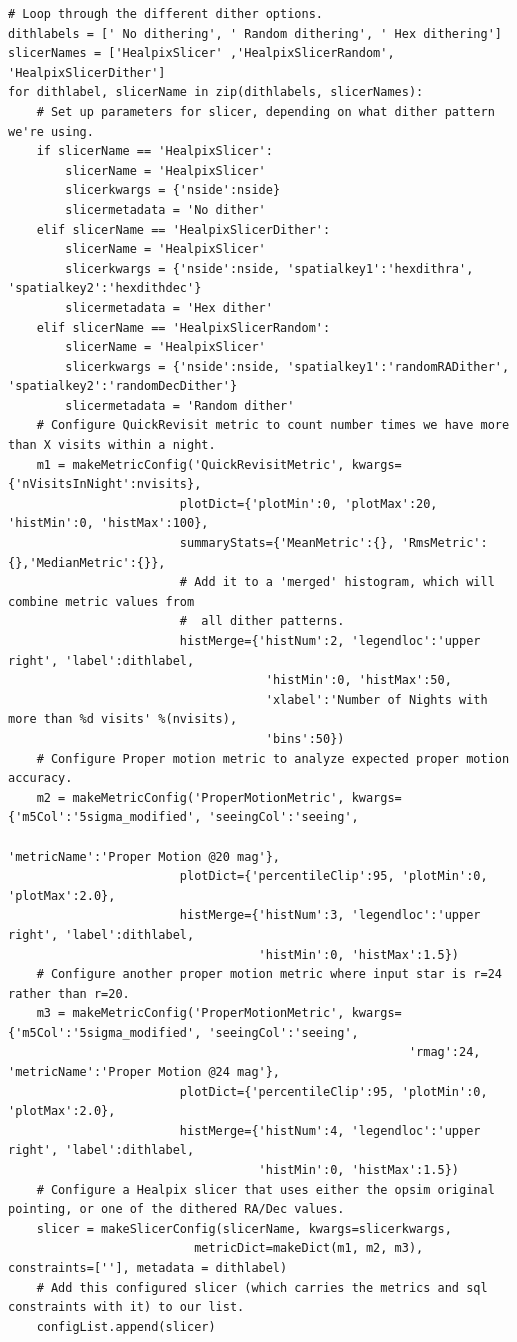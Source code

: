 \documentclass[]{spie}  %
\begin{document}
\begin{lstlisting}
# Loop through the different dither options.
dithlabels = [' No dithering', ' Random dithering', ' Hex dithering']
slicerNames = ['HealpixSlicer' ,'HealpixSlicerRandom', 'HealpixSlicerDither'] 
for dithlabel, slicerName in zip(dithlabels, slicerNames):
    # Set up parameters for slicer, depending on what dither pattern we're using.
    if slicerName == 'HealpixSlicer':
        slicerName = 'HealpixSlicer'
        slicerkwargs = {'nside':nside}
        slicermetadata = 'No dither'
    elif slicerName == 'HealpixSlicerDither':
        slicerName = 'HealpixSlicer'
        slicerkwargs = {'nside':nside, 'spatialkey1':'hexdithra', 'spatialkey2':'hexdithdec'}
        slicermetadata = 'Hex dither'
    elif slicerName == 'HealpixSlicerRandom':
        slicerName = 'HealpixSlicer'
        slicerkwargs = {'nside':nside, 'spatialkey1':'randomRADither', 'spatialkey2':'randomDecDither'}
        slicermetadata = 'Random dither'
    # Configure QuickRevisit metric to count number times we have more than X visits within a night.
    m1 = makeMetricConfig('QuickRevisitMetric', kwargs={'nVisitsInNight':nvisits}, 
                        plotDict={'plotMin':0, 'plotMax':20, 'histMin':0, 'histMax':100},
                        summaryStats={'MeanMetric':{}, 'RmsMetric':{},'MedianMetric':{}},
                        # Add it to a 'merged' histogram, which will combine metric values from
                        #  all dither patterns.
                        histMerge={'histNum':2, 'legendloc':'upper right', 'label':dithlabel,
                                    'histMin':0, 'histMax':50,
                                    'xlabel':'Number of Nights with more than %d visits' %(nvisits),
                                    'bins':50})
    # Configure Proper motion metric to analyze expected proper motion accuracy.
    m2 = makeMetricConfig('ProperMotionMetric', kwargs={'m5Col':'5sigma_modified', 'seeingCol':'seeing',
                                                        'metricName':'Proper Motion @20 mag'},
                        plotDict={'percentileClip':95, 'plotMin':0, 'plotMax':2.0},
                        histMerge={'histNum':3, 'legendloc':'upper right', 'label':dithlabel,
                                   'histMin':0, 'histMax':1.5})
    # Configure another proper motion metric where input star is r=24 rather than r=20.
    m3 = makeMetricConfig('ProperMotionMetric', kwargs={'m5Col':'5sigma_modified', 'seeingCol':'seeing',
                                                        'rmag':24, 'metricName':'Proper Motion @24 mag'},
                        plotDict={'percentileClip':95, 'plotMin':0, 'plotMax':2.0},
                        histMerge={'histNum':4, 'legendloc':'upper right', 'label':dithlabel,
                                   'histMin':0, 'histMax':1.5})
    # Configure a Healpix slicer that uses either the opsim original pointing, or one of the dithered RA/Dec values.
    slicer = makeSlicerConfig(slicerName, kwargs=slicerkwargs, 
                          metricDict=makeDict(m1, m2, m3), constraints=[''], metadata = dithlabel)
    # Add this configured slicer (which carries the metrics and sql constraints with it) to our list.
    configList.append(slicer)


\end{lstlisting}
\end{document}
